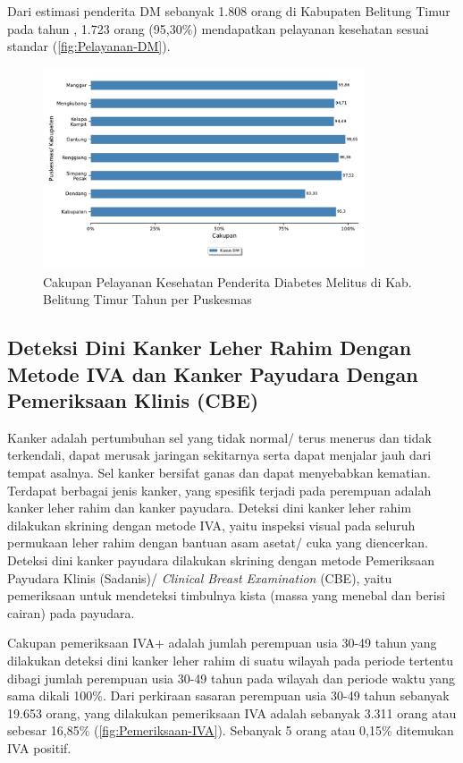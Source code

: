 Dari estimasi penderita DM sebanyak 1.808 orang di Kabupaten Belitung Timur pada tahun \tP, 1.723 orang (95,30\%) mendapatkan pelayanan kesehatan sesuai standar (\autoref{fig:Pelayanan-DM}).

\begin{figure}[H]
  \centering
  \includegraphics[width=0.85\textwidth]{bab_06/bab_06_14_DM}
  \caption{Cakupan Pelayanan Kesehatan Penderita Diabetes Melitus di Kab. Belitung Timur Tahun \tP per Puskesmas}
  \label{fig:Pelayanan-DM}
\end{figure}

\subsection{Deteksi Dini Kanker Leher Rahim Dengan Metode IVA dan Kanker Payudara Dengan Pemeriksaan Klinis (CBE)}
Kanker adalah pertumbuhan sel yang tidak normal/ terus menerus dan tidak terkendali, dapat merusak jaringan sekitarnya serta dapat menjalar jauh dari tempat asalnya. Sel kanker bersifat ganas dan dapat menyebabkan kematian.
Terdapat berbagai jenis kanker, yang spesifik terjadi pada perempuan adalah kanker leher rahim dan kanker payudara.
Deteksi dini kanker leher rahim dilakukan skrining dengan metode IVA, yaitu inspeksi visual pada seluruh permukaan leher rahim dengan bantuan asam asetat/ cuka yang diencerkan.
Deteksi dini kanker payudara dilakukan skrining dengan metode Pemeriksaan Payudara Klinis (Sadanis)/ \emph{Clinical Breast Examination} (CBE), yaitu pemeriksaan untuk mendeteksi timbulnya kista (massa yang menebal dan berisi cairan) pada payudara.

Cakupan pemeriksaan IVA+ adalah jumlah perempuan usia 30-49 tahun yang dilakukan deteksi dini kanker leher rahim di suatu wilayah pada periode tertentu dibagi jumlah perempuan usia 30-49 tahun pada wilayah dan periode waktu yang sama dikali 100\%.
Dari perkiraan sasaran perempuan usia 30-49 tahun sebanyak 19.653 orang, yang dilakukan pemeriksaan IVA adalah sebanyak 3.311 orang atau sebesar 16,85\% (\autoref{fig:Pemeriksaan-IVA}).
Sebanyak 5 orang atau 0,15\% ditemukan IVA positif.

